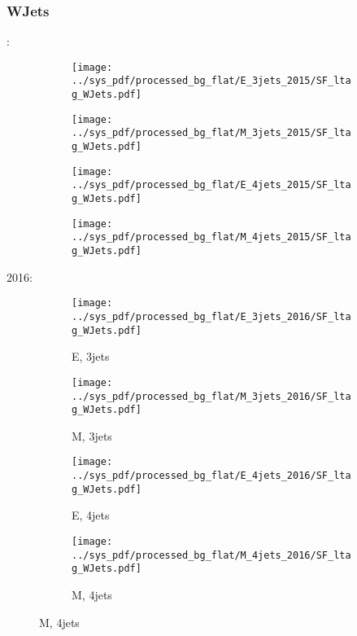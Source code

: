 \documentclass{beamer}
\begin{document}
\begin{frame}
\frametitle{WJets}
\fontsize{5}{1}:
\begin{figure}
\centering
\begin{subfigure}[b]{0.24\textwidth}
\texttt{[image: ../sys\_pdf/processed\_bg\_flat/E\_3jets\_2015/SF\_ltag\_WJets.pdf]}
\end{subfigure}
\begin{subfigure}[b]{0.24\textwidth}
\texttt{[image: ../sys\_pdf/processed\_bg\_flat/M\_3jets\_2015/SF\_ltag\_WJets.pdf]}
\end{subfigure}
\begin{subfigure}[b]{0.24\textwidth}
\texttt{[image: ../sys\_pdf/processed\_bg\_flat/E\_4jets\_2015/SF\_ltag\_WJets.pdf]}
\end{subfigure}
\begin{subfigure}[b]{0.24\textwidth}
\texttt{[image: ../sys\_pdf/processed\_bg\_flat/M\_4jets\_2015/SF\_ltag\_WJets.pdf]}
\end{subfigure}
\end{figure}
2016:
\begin{figure}
\centering
\begin{subfigure}[b]{0.24\textwidth}
\texttt{[image: ../sys\_pdf/processed\_bg\_flat/E\_3jets\_2016/SF\_ltag\_WJets.pdf]}
\captionsetup{font=tiny}
\caption{E, 3jets}
\end{subfigure}
\begin{subfigure}[b]{0.24\textwidth}
\texttt{[image: ../sys\_pdf/processed\_bg\_flat/M\_3jets\_2016/SF\_ltag\_WJets.pdf]}
\captionsetup{font=tiny}
\caption{M, 3jets}
\end{subfigure}
\begin{subfigure}[b]{0.24\textwidth}
\texttt{[image: ../sys\_pdf/processed\_bg\_flat/E\_4jets\_2016/SF\_ltag\_WJets.pdf]}
\captionsetup{font=tiny}
\caption{E, 4jets}
\end{subfigure}
\begin{subfigure}[b]{0.24\textwidth}
\texttt{[image: ../sys\_pdf/processed\_bg\_flat/M\_4jets\_2016/SF\_ltag\_WJets.pdf]}
\captionsetup{font=tiny}
\caption{M, 4jets}
\end{subfigure}
\end{figure}
\end{frame}
\end{document}
